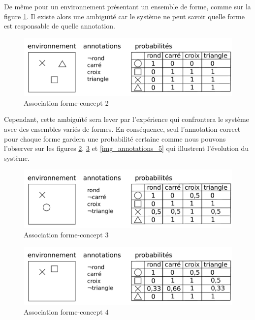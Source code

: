 De même pour un environnement présentant un ensemble de forme, comme sur la figure \ref{img_annotations_2}. Il existe alors une ambiguïté car le système ne peut savoir quelle forme est responsable de quelle annotation.  

\begin{figure}[H] 
\includegraphics[width=\textwidth]{files/raisonneur/annotations_2} 
\caption{Association forme-concept 2} 
\label{img_annotations_2}
\end{figure}

Cependant, cette ambiguïté sera lever par l'expérience qui confrontera le système avec des ensembles variés de formes. En conséquence, seul l'annotation correct pour chaque forme gardera une probabilité certaine comme nous pouvons l'observer sur les figures \ref{img_annotations_3}, \ref{img_annotations_4} et \ref{img_annotations_5} qui illustrent l'évolution du système. 

\begin{figure}[H] 
\includegraphics[width=\textwidth]{files/raisonneur/annotations_3} 
\caption{Association forme-concept 3} 
\label{img_annotations_3}
\end{figure}

\begin{figure}[H] 
\includegraphics[width=\textwidth]{files/raisonneur/annotations_4} 
\caption{Association forme-concept 4} 
\label{img_annotations_4}
\end{figure}

